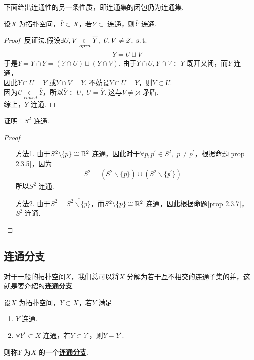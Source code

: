	\newpage
	下面给出连通性的另一条性质，即连通集的闭包仍为连通集.
	\begin{proposition}\label{prop 2.3.7}
		设$X$ 为拓扑空间，$\overline{Y} \subset X$，若$Y \subset$ 连通，则$\overline{Y}$ 连通.
		
		\vspace*{2em}
		\begin{proof}
			反证法.假设$\exists U , V \underset{open}{\subset} \overline{Y} , \,\, U , V \neq \varnothing , \,\, \operatorname{s.t.}$
			\begin{align}
				\overline{Y} = U \sqcup V
			\end{align}
			于是$Y = Y \cap \overline{Y} = (Y \cap U) \sqcup (Y \cap V)$. 由于$Y \cap U , Y \cap V \subset Y$ 既开又闭，而$Y$ 连通，\\
			因此$Y \cap U = Y$ 或$Y \cap V = Y$. 不妨设$Y \cap U = Y$，则$Y \subset U$.\\
			因为$U \underset{closed}{\subset} \overline{Y}$，所以$\overline{Y} \subset U , \,\, U = \overline{Y}$. 这与$V \neq \varnothing$ 矛盾.\\
			综上，$\overline{Y}$ 连通.
		\end{proof}
	\end{proposition}

	\vspace*{2em}
	\begin{example}
		证明：$S^2$ 连通.
		
		\vspace*{2em}
		\begin{proof}
			\begin{enumerate}
				\item[方法1.]由于$S^2 \backslash \{ p \} \cong \mathbb{R}^2$ 连通，因此对于$\forall p , p^{'} \in S^2 , \,\, p \neq p^{'}$，根据命题\ref{prop 2.3.5}，因为
				\begin{align}
					S^2 = (S^2 \backslash \{ p \}) \cup (S^2 \backslash \{ p^{'} \})
				\end{align}
				所以$S^2$ 连通.
				
				\item[方法2.]由于$S^2 = \overline{S^2 \backslash \{ p \}}$，而$S^2 \backslash \{ p \} \cong \mathbb{R}^2$ 连通，因此根据命题\ref{prop 2.3.7}，$S^2$ 连通.
			\end{enumerate}
		\end{proof}
	\end{example}
	
\newpage
\subsection{连通分支}
	对于一般的拓扑空间$X$，我们总可以将$X$ 分解为若干互不相交的连通子集的并，这就是要介绍的\textbf{连通分支}.
	\begin{defn}
		设$X$ 为拓扑空间，$Y \subset X$，若$Y$ 满足
		\begin{enumerate}
			\item $Y$ 连通.
			
			\item $\forall Y^{'} \subset X$ 连通，若$Y \subset Y^{'}$，则$Y = Y^{'}$.
		\end{enumerate}
		则称$Y$ 为$X$ 的一个\underline{\textbf{连通分支}}.
	\end{defn}

